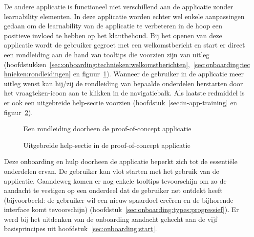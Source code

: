 De andere applicatie is functioneel niet verschillend aan de applicatie zonder learnability elementen. In deze applicatie worden echter wel enkele aanpassingen gedaan om de learnability van de applicatie te verbeteren in de hoop een positieve invloed te hebben op het klantbehoud. Bij het openen van deze applicatie wordt de gebruiker gegroet met een welkomstbericht en start er direct een rondleiding aan de hand van tooltips die voorzien zijn van uitleg (hoofdstukken~\ref{sec:onboarding:technieken:welkomstberichten},~\ref{sec:onboarding:technieken:rondleidingen} en figuur~\ref{fig:piggy:onboarding}). Wanneer de gebruiker in de applicatie meer uitleg wenst kan hij/zij de rondleiding van bepaalde onderdelen herstarten door het vraagteken-icoon aan te klikken in de navigatiebalk. Als laatste redmiddel is er ook een uitgebreide help-sectie voorzien (hoofdstuk~\ref{sec:in-app-training} en figuur~\ref{fig:piggy:help}).

\begin{figure}[h!]
    \centering
    \qquad
    \caption{Een rondleiding doorheen de proof-of-concept applicatie}
    \label{fig:piggy:onboarding}
\end{figure}

\begin{figure}[h!]
    \centering
    \qquad
    \caption{Uitgebreide help-sectie in de proof-of-concept applicatie}
    \label{fig:piggy:help}
\end{figure}

Deze onboarding en hulp doorheen de applicatie beperkt zich tot de essentiële onderdelen ervan. De gebruiker kan vlot starten met het gebruik van de applicatie. Gaandeweg komen er nog enkele tooltips tevoorschijn om zo de aandacht te vestigen op een onderdeel dat de gebruiker net ontdekt heeft (bijvoorbeeld: de gebruiker wil een nieuw spaardoel creëren en de bijhorende interface komt tevoorschijn) (hoofdstuk~\ref{sec:onboarding:types:progressief}). Er werd bij het uitdenken van de onboarding aandacht gehecht aan de vijf basisprincipes uit hoofdstuk~\ref{sec:onboarding:start}.

